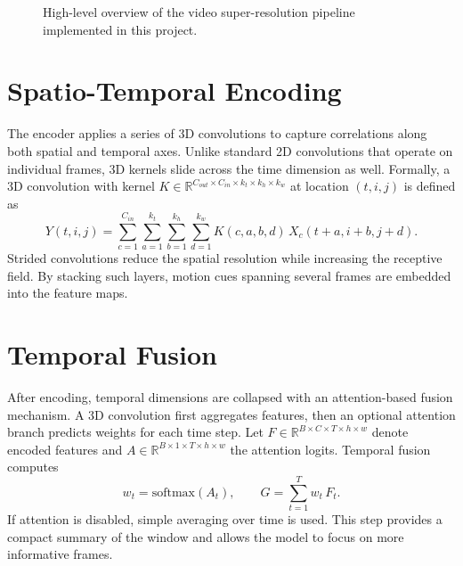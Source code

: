 \documentclass{article}
\begin{document}
\begin{figure}[h]
\centering
{}
\caption{High-level overview of the video super-resolution pipeline implemented in this project.}
\label{fig:architecture}
\end{figure}

\section{Spatio-Temporal Encoding}
The encoder applies a series of 3D convolutions to capture correlations along both spatial and temporal axes. Unlike standard 2D convolutions that operate on individual frames, 3D kernels slide across the time dimension as well. Formally, a 3D convolution with kernel $K \in \mathbb{R}^{C_{out}\times C_{in}\times k_t\times k_h\times k_w}$ at location $(t,i,j)$ is defined as
\begin{equation}
Y(t,i,j) = \sum_{c=1}^{C_{in}} \sum_{a=1}^{k_t} \sum_{b=1}^{k_h} \sum_{d=1}^{k_w} K(c,a,b,d) \, X_{c}(t+a,i+b,j+d).
\end{equation}
Strided convolutions reduce the spatial resolution while increasing the receptive field. By stacking such layers, motion cues spanning several frames are embedded into the feature maps.

\section{Temporal Fusion}
After encoding, temporal dimensions are collapsed with an attention-based fusion mechanism. A 3D convolution first aggregates features, then an optional attention branch predicts weights for each time step. Let $F \in \mathbb{R}^{B\times C\times T\times h\times w}$ denote encoded features and $A \in \mathbb{R}^{B\times 1\times T\times h\times w}$ the attention logits. Temporal fusion computes
\begin{equation}
w_t = \mathrm{softmax}(A_t), \qquad G = \sum_{t=1}^{T} w_t \, F_t.
\end{equation}
If attention is disabled, simple averaging over time is used. This step provides a compact summary of the window and allows the model to focus on more informative frames.
\end{document}
